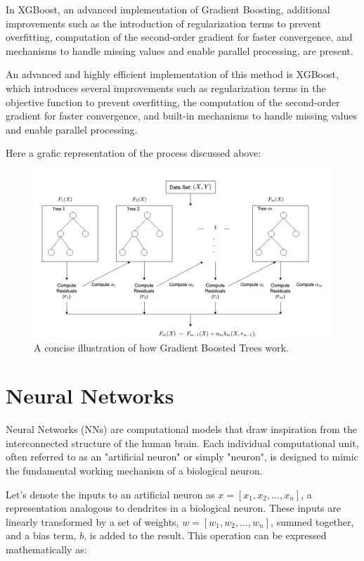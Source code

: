 In XGBoost, an advanced implementation of Gradient Boosting, additional improvements such as the introduction of regularization terms to prevent overfitting, computation of the second-order gradient for faster convergence, and mechanisms to handle missing values and enable parallel processing, are present. 


An advanced and highly efficient implementation of this method is XGBoost, which introduces several improvements such as regularization terms in the objective function to prevent overfitting, the computation of the second-order gradient for faster convergence, and built-in mechanisms to handle missing values and enable parallel processing.

Here a grafic representation of the process discussed above:


\begin{figure}[h!]
	\centering
	\includegraphics[width=0.9\linewidth]{Images/XGBoost}
	\caption{A concise illustration of how Gradient Boosted Trees work.}
	\label{fig:xgboost}
\end{figure}


\section{Neural Networks}
Neural Networks (NNs) are computational models that draw inspiration from the interconnected structure of the human brain. Each individual computational unit, often referred to as an "artificial neuron" or simply "neuron", is designed to mimic the fundamental working mechanism of a biological neuron.

Let's denote the inputs to an artificial neuron as $ x = [x_1, x_2, ..., x_n] $, a representation analogous to dendrites in a biological neuron. These inputs are linearly transformed by a set of weights, $ w = [w_1, w_2, ..., w_n] $, summed together, and a bias term, $ b $, is added to the result. This operation can be expressed mathematically as:

